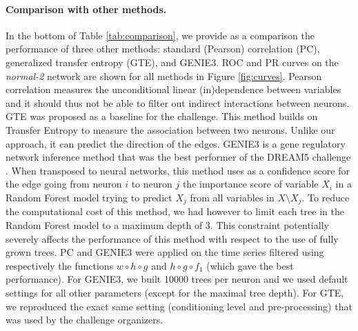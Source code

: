 \documentclass[wcp]{jmlr}
\begin{document}
\paragraph{Comparison with other methods.}

In the bottom of Table \ref{tab:comparison}, we provide as a comparison the
performance of three other methods: standard (Pearson) correlation (PC),
generalized transfer entropy (GTE), and GENIE3. ROC and PR curves on the
\textit{normal-2} network are shown for all methods in Figure
\ref{fig:curves}. Pearson correlation measures the unconditional linear
(in)dependence between variables and it should thus not be able to filter out
indirect interactions between neurons. GTE \citep{stetter2012model} was
proposed as a baseline for the challenge. This method builds on Transfer
Entropy to measure the association between two neurons. Unlike our approach, it
can predict the direction of the edges. GENIE3 \citep{huynhthu2010inferring} is
a gene regulatory network inference method that was the best performer of the
DREAM5 challenge \citep{marbach2012}. When transposed to neural networks, this
method uses as a confidence score for the edge going from neuron $i$ to neuron
$j$ the importance score of variable $X_i$ in a Random Forest model trying to
predict $X_j$ from all variables in $X\setminus X_j$. To reduce the
computational cost of this method, we had however to limit each tree in the
Random Forest model to a maximum depth of 3. This constraint potentially
severely affects the performance of this method with respect to the use of
fully grown trees. PC and GENIE3 were applied on the time series filtered using
respectively the functions $w\circ h\circ g$ and $h\circ g\circ f_1$ (which
gave the best performance). For GENIE3, we built 10000 trees per neuron and we
used default settings for all other parameters (except for the maximal tree
depth). For GTE, we reproduced the exact same setting (conditioning level and
pre-processing) that was used by the challenge organizers.

\end{document}

